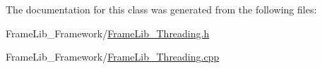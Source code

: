 The documentation for this class was generated from the following files\+:\begin{DoxyCompactItemize}
\item 
Frame\+Lib\+\_\+\+Framework/\hyperlink{_frame_lib___threading_8h}{Frame\+Lib\+\_\+\+Threading.\+h}\item 
Frame\+Lib\+\_\+\+Framework/\hyperlink{_frame_lib___threading_8cpp}{Frame\+Lib\+\_\+\+Threading.\+cpp}\end{DoxyCompactItemize}
